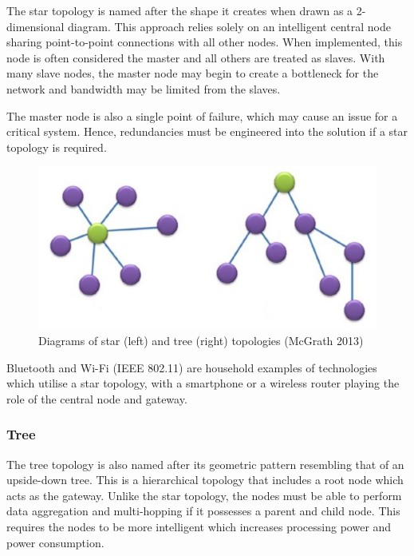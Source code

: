 The star topology is named after the shape it creates when drawn as a 2-dimensional diagram. This approach relies solely on an intelligent central node sharing point-to-point connections with all other nodes. When implemented, this node is often considered the master and all others are treated as slaves. With many slave nodes, the master node may begin to create a bottleneck for the network and bandwidth may be limited from the slaves.

The master node is also a single point of failure, which may cause an issue for a critical system. Hence, redundancies must be engineered into the solution if a star topology is required.

\begin{figure}[h]
\centering
\includegraphics{Figures/star-tree-topology.JPG}
\decoRule
\caption[Star and tree network topologies]{Diagrams of star (left) and tree (right) topologies (McGrath 2013)}
\label{fig:StarTreeTopology}
\end{figure}

Bluetooth and Wi-Fi (IEEE 802.11) are household examples of technologies which utilise a star topology, with a smartphone or a wireless router playing the role of the central node and gateway.


\subsubsection{Tree}


The tree topology is also named after its geometric pattern resembling that of an upside-down tree. This is a hierarchical topology that includes a root node which acts as the gateway. Unlike the star topology, the nodes must be able to perform data aggregation and multi-hopping if it possesses a parent and child node. This requires the nodes to be more intelligent which increases processing power and power consumption.

